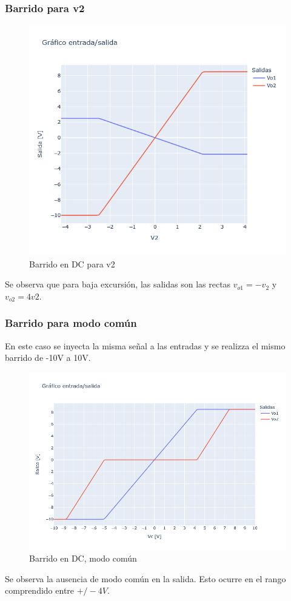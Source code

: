 \subsubsection{Barrido para v2}
\begin{figure}[h!]
    \centering
    \includegraphics[width=0.7\linewidth]{Secciones/Circuito1/TP1_1_Vo1_Vo2_vs_V2.png}
    
    \caption{Barrido en DC para v2}
\end{figure}
Se observa que para baja excursión, las salidas son las rectas \(v_{o1}= -v_2\)  y \(v_{o2}= 4v2\).

\subsubsection{Barrido para modo común}

En este caso se inyecta la misma señal a las entradas y se realizza el mismo barrido de -10V a 10V.
\begin{figure}[H]
    \centering
    \includegraphics[width=1\linewidth]{Secciones/Circuito1/TP1_1_Vo1_Vo2_vs_Vc.png}
    
    \caption{Barrido en DC, modo común}
\end{figure}
Se observa la ausencia de modo común en la salida. Esto ocurre en el rango comprendido entre \(+/-4V\).

